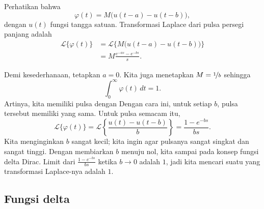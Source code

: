 Perhatikan bahwa
\begin{equation*}
\varphi(t) = M \bigl( u(t-a) - u(t-b) \bigr) ,
\end{equation*}
dengan $u(t)$ fungsi tangga satuan.
Transformasi Laplace dari pulsa persegi panjang adalah
\begin{equation*}
\begin{split}
{\mathcal{L}} \bigl\{ \varphi(t) \bigr\}
& =
{\mathcal{L}} \bigl\{ M \bigl( u(t-a) - u(t-b) \bigr)  \bigr\}
\\
& =
M
\frac{e^{-as} - e^{-bs}}{s} .
\end{split}
\end{equation*}

Demi kesederhanaan, tetapkan $a=0$.
Kita juga
menetapkan $M = \nicefrac{1}{b}$ sehingga
\begin{equation*}
\int_0^\infty \varphi(t) \,dt = 1 .
\end{equation*}
Artinya, kita memiliki pulsa dengan 
Dengan cara ini, untuk setiap $b$, pulsa tersebut memiliki  yang sama.
Untuk pulsa semacam itu,
\begin{equation*}
{\mathcal{L}} \bigl\{ \varphi(t) \bigr\}
=
{\mathcal{L}} \left\{ \frac{u(t) - u(t-b)}{b}  \right\}
=
\frac{1 - e^{-bs}}{bs} .
\end{equation*}
Kita menginginkan $b$ sangat kecil; kita ingin agar
pulsanya sangat singkat dan sangat tinggi.  Dengan membiarkan $b$ menuju nol, kita sampai
pada konsep fungsi delta Dirac.  Limit
dari $\frac{1-e^{-bs}}{bs}$
ketika $b \to 0$ adalah $1$, jadi kita mencari suatu  yang transformasi
Laplace-nya adalah $1$.

\subsection{Fungsi delta}

